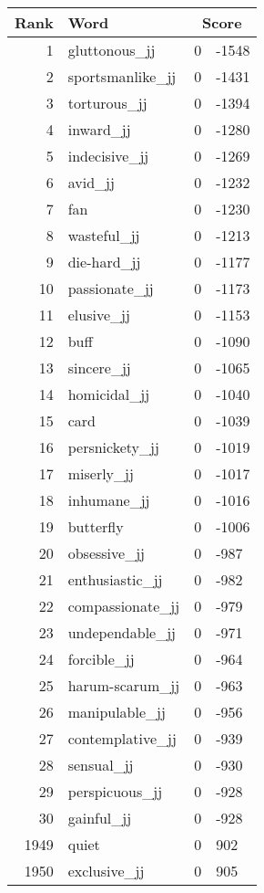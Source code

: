 \begin{longtable}[!htbp]{| rlr@{.}l |}
    \hline
    \textbf{Rank} & \textbf{Word} & \multicolumn{2}{c|}{\textbf{Score}} \\
    \hline
    \endhead
    1 & gluttonous\_jj & 0 & -1548 \\
    2 & sportsmanlike\_jj & 0 & -1431 \\
    3 & torturous\_jj & 0 & -1394 \\
    4 & inward\_jj & 0 & -1280 \\
    5 & indecisive\_jj & 0 & -1269 \\
    6 & avid\_jj & 0 & -1232 \\
    7 & fan & 0 & -1230 \\
    8 & wasteful\_jj & 0 & -1213 \\
    9 & die-hard\_jj & 0 & -1177 \\
    10 & passionate\_jj & 0 & -1173 \\
    11 & elusive\_jj & 0 & -1153 \\
    12 & buff & 0 & -1090 \\
    13 & sincere\_jj & 0 & -1065 \\
    14 & homicidal\_jj & 0 & -1040 \\
    15 & card & 0 & -1039 \\
    16 & persnickety\_jj & 0 & -1019 \\
    17 & miserly\_jj & 0 & -1017 \\
    18 & inhumane\_jj & 0 & -1016 \\
    19 & butterfly & 0 & -1006 \\
    20 & obsessive\_jj & 0 & -987 \\
    21 & enthusiastic\_jj & 0 & -982 \\
    22 & compassionate\_jj & 0 & -979 \\
    23 & undependable\_jj & 0 & -971 \\
    24 & forcible\_jj & 0 & -964 \\
    25 & harum-scarum\_jj & 0 & -963 \\
    26 & manipulable\_jj & 0 & -956 \\
    27 & contemplative\_jj & 0 & -939 \\
    28 & sensual\_jj & 0 & -930 \\
    29 & perspicuous\_jj & 0 & -928 \\
    30 & gainful\_jj & 0 & -928 \\
    1949 & quiet & 0 & 902 \\
    1950 & exclusive\_jj & 0 & 905 \\

\end{longtable}
